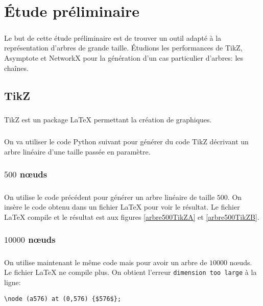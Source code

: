 \chapter{Étude préliminaire}

\paragraph{}Le but de cette étude préliminaire est de trouver un outil adapté à la représentation d'arbres de grande taille. Étudions les performances de TikZ, Asymptote et NetworkX pour la génération d'un cas particulier d'arbres: les chaînes.

	\section{TikZ}

\paragraph{}TikZ est un package \LaTeX{} permettant la création de graphiques.

\paragraph{}On va utiliser le code Python suivant pour générer du code TikZ décrivant un arbre linéaire d'une taille passée en paramètre.


		\subsection{$500$ n\oe uds}

\paragraph{}On utilise le code précédent pour générer un arbre linéaire de taille $500$. On insère le code obtenu dans un fichier \LaTeX{} pour voir le résultat. Le fichier \LaTeX{} compile et le résultat est aux figures \ref{arbre500TikZA} et \ref{arbre500TikZB}.

		\subsection{$10000$ n\oe uds}
		
\paragraph{}On utilise maintenant le même code mais pour avoir un arbre de $10000$ n\oe uds. Le fichier \LaTeX{} ne compile plus. On obtient l'erreur \verb|dimension too large| à la ligne:
\begin{lstlisting}
\node (a576) at (0,576) {$576$};
\end{lstlisting}


